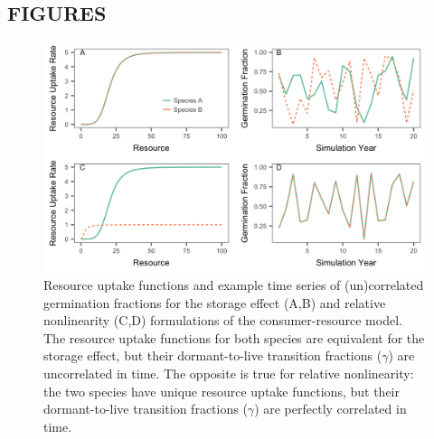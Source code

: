 \documentclass[12pt,]{article}
\begin{document}
\newpage{}

\subsection{FIGURES}\label{figures}

\begin{figure}[htbp]
\centering
\includegraphics{components/figure/manuscript-model_types-1.png}
\caption{Resource uptake functions and example time series of
(un)correlated germination fractions for the storage effect (A,B) and
relative nonlinearity (C,D) formulations of the consumer-resource model.
The resource uptake functions for both species are equivalent for the
storage effect, but their dormant-to-live transition fractions
(\(\gamma\)) are uncorrelated in time. The opposite is true for relative
nonlinearity: the two species have unique resource uptake functions, but
their dormant-to-live transition fractions (\(\gamma\)) are perfectly
correlated in time.}
\end{figure}

\newpage{}
\end{document}
